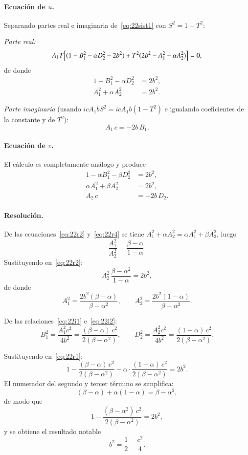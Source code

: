 \documentclass[letterpaper,11pt]{exam}
\theoremstyle{plain}
\begin{document}
\paragraph{Ecuación de $u$.}
Separando partes real e imaginaria de~\eqref{eq:22sist1} con $S^2 = 1 - T^2$:

\emph{Parte real:}
\[
  A_1 T\Bigl[(1 - B_1^2 - \alpha D_2^2 - 2b^2) + T^2(2b^2 - A_1^2 - \alpha A_2^2)\Bigr] = 0,
\]
de donde
\begin{align}
  1 - B_1^2 - \alpha D_2^2 &= 2b^2, \label{eq:22r1}\\
  A_1^2 + \alpha A_2^2 &= 2b^2. \label{eq:22r2}
\end{align}

\emph{Parte imaginaria} (usando $icA_1 b S^2 = icA_1 b(1-T^2)$ e igualando
coeficientes de la constante y de $T^2$):
\begin{equation}
  A_1\,c = -2b\,B_1. \label{eq:22i1}
\end{equation}

\paragraph{Ecuación de $v$.}
El cálculo es completamente análogo y produce
\begin{align}
  1 - \alpha B_1^2 - \beta D_2^2 &= 2b^2, \label{eq:22r3}\\
  \alpha A_1^2 + \beta A_2^2 &= 2b^2, \label{eq:22r4}\\
  A_2\,c &= -2b\,D_2. \label{eq:22i2}
\end{align}

\paragraph{Resolución.}
De las ecuaciones~\eqref{eq:22r2} y~\eqref{eq:22r4} se tiene
$A_1^2 + \alpha A_2^2 = \alpha A_1^2 + \beta A_2^2$, luego
\[
  \frac{A_1^2}{A_2^2} = \frac{\beta - \alpha}{1 - \alpha}.
\]
Sustituyendo en~\eqref{eq:22r2}:
\[
  A_2^2\,\frac{\beta - \alpha^2}{1-\alpha} = 2b^2,
\]
de donde
\[
  A_1^2 = \frac{2b^2(\beta-\alpha)}{\beta-\alpha^2},
  \qquad
  A_2^2 = \frac{2b^2(1-\alpha)}{\beta-\alpha^2}.
\]

De las relaciones~\eqref{eq:22i1} e~\eqref{eq:22i2}:
\[
  B_1^2 = \frac{A_1^2 c^2}{4b^2} = \frac{(\beta-\alpha)\,c^2}{2(\beta-\alpha^2)},
  \qquad
  D_2^2 = \frac{A_2^2 c^2}{4b^2} = \frac{(1-\alpha)\,c^2}{2(\beta-\alpha^2)}.
\]

Sustituyendo en~\eqref{eq:22r1}:
\[
  1 - \frac{(\beta-\alpha)\,c^2}{2(\beta-\alpha^2)} - \alpha\cdot\frac{(1-\alpha)\,c^2}{2(\beta-\alpha^2)}
  = 2b^2.
\]
El numerador del segundo y tercer término se simplifica:
\[
  (\beta-\alpha) + \alpha(1-\alpha) = \beta - \alpha^2,
\]
de modo que
\[
  1 - \frac{(\beta-\alpha^2)\,c^2}{2(\beta-\alpha^2)} = 2b^2,
\]
y se obtiene el resultado notable
\[
  \boxed{b^2 = \frac{1}{2} - \frac{c^2}{4}.}
\]
\end{document}
